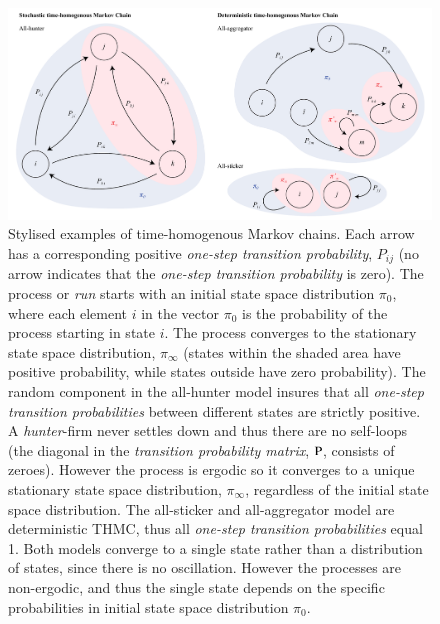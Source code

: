 \documentclass[preprint, 12pt]{elsarticle}
\begin{document}
\begin{figure}[ht!]
	\centering
	\includegraphics[width=\textwidth]{Graphics/Markov2.pdf}
	\caption{Stylised examples of time-homogenous Markov chains. Each arrow has a corresponding positive \emph{one-step transition probability}, $P_{ij}$ (no arrow indicates that the \emph{one-step transition probability} is zero). The process or \emph{run} starts with an initial state space distribution $\pi_0$, where each element $i$ in the vector $\pi_0$ is the probability of the process starting in state $i$. The process converges to the stationary state space distribution, $\pi_\infty$ (states within the shaded area have positive probability, while states outside have zero probability). The random component in the all-hunter model insures that all \emph{one-step transition probabilities} between different states are strictly positive. A \emph{hunter}-firm never settles down and thus there are no self-loops (the diagonal in the \emph{transition probability matrix}, $\rm P$, consists of zeroes). However the process is ergodic so it converges to a unique stationary state space distribution, $\pi_\infty$, regardless of the initial state space distribution. The all-sticker and all-aggregator model are deterministic THMC, thus all \emph{one-step transition probabilities} equal 1. Both models converge to a single state rather than a distribution of states, since there is no oscillation. However the processes are non-ergodic, and thus the single state depends on the specific probabilities in initial state space distribution $\pi_0$.}
	\label{fig:markov}
\end{figure}
\end{document}
